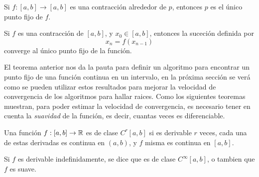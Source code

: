 \begin{proposition}
  Si $f:[a, b] \to [a, b]$ es una contracción alrededor de $p$, entonces $p$ es el único punto fijo de $f$.
\end{proposition}

\begin{theorem}
  Si $f$ es una contracción de $[a, b]$, y $x_0 \in [a, b]$, entonces la suceción definida por 
\[x_n = f(x_{n -1})\]
converge al único punto fijo de la función.
\end{theorem}

El teorema anterior nos da la pauta para definir un algoritmo para encontrar un punto fijo de una función continua en un intervalo, en la próxima sección se verá como se pueden utilizar estos resultados para mejorar la velocidad de convergencia de los algoritmos para hallar raices. Como los siguientes teoremas muestran, para poder estimar la velocidad de convergencia, es necesario tener en cuenta la \emph{suavidad} de la función, es decir, cuantas veces es diferenciable.

\begin{definition}
  Una función $f:[a, b] \to \mathbb{R}$ es de clase $C^r[a, b]$ si es derivable $r$ veces, cada una de estas derivadas es continua en $(a, b)$, y $f$ misma es continua en $[a, b]$.
\end{definition}

\begin{definition}
  Si $f$ es derivable indefinidamente, se dice que es de clase $C^\infty[a, b]$, o tambien que $f$ es suave.
\end{definition}




